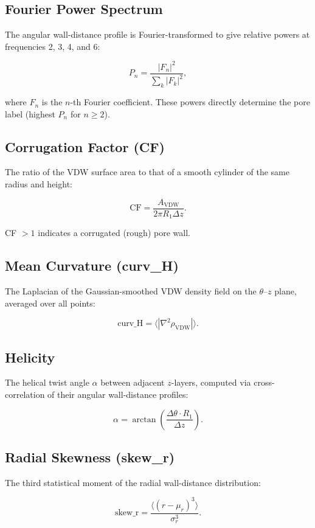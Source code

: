 \documentclass[11pt,a4paper]{article}
\begin{document}
\subsection{Fourier Power Spectrum}

The angular wall-distance profile is Fourier-transformed to give relative
powers at frequencies 2, 3, 4, and 6:

\[
P_n = \frac{|F_n|^2}{\sum_{k} |F_k|^2},
\]

where $F_n$ is the $n$-th Fourier coefficient.  These powers directly
determine the pore label (highest $P_n$ for $n \ge 2$).

\subsection{Corrugation Factor (CF)}

The ratio of the VDW surface area to that of a smooth cylinder of the
same radius and height:

\[
\text{CF} = \frac{A_{\text{VDW}}}{2\pi R_1 \Delta z}.
\]

CF $> 1$ indicates a corrugated (rough) pore wall.

\subsection{Mean Curvature (curv\_H)}

The Laplacian of the Gaussian-smoothed VDW density field on the
$\theta$--$z$ plane, averaged over all points:

\[
\text{curv\_H} = \langle |\nabla^2 \rho_{\text{VDW}}| \rangle.
\]

\subsection{Helicity}

The helical twist angle $\alpha$ between adjacent $z$-layers, computed
via cross-correlation of their angular wall-distance profiles:

\[
\alpha = \arctan\!\left(\frac{\Delta\theta \cdot R_1}{\Delta z}\right).
\]

\subsection{Radial Skewness (skew\_r)}

The third statistical moment of the radial wall-distance distribution:

\[
\text{skew\_r} = \frac{\langle (r - \mu_r)^3 \rangle}{\sigma_r^3}.
\]
\end{document}
